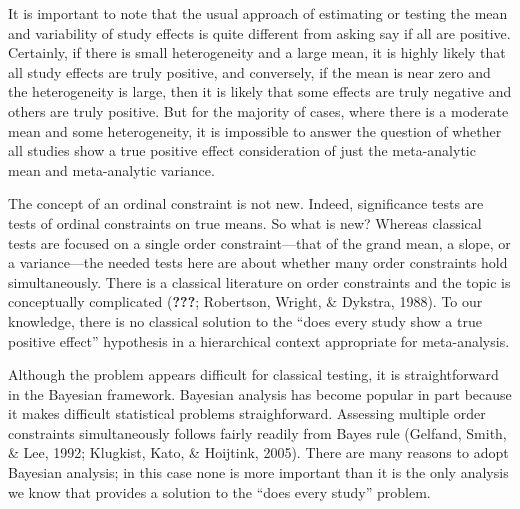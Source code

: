 \documentclass[english,man]{apa6}
\theoremstyle{definition}
\theoremstyle{definition}
\theoremstyle{definition}
\theoremstyle{remark}
\begin{document}
It is important to note that the usual approach of estimating or testing
the mean and variability of study effects is quite different from asking
say if all are positive. Certainly, if there is small heterogeneity and
a large mean, it is highly likely that all study effects are truly
positive, and conversely, if the mean is near zero and the heterogeneity
is large, then it is likely that some effects are truly negative and
others are truly positive. But for the majority of cases, where there is
a moderate mean and some heterogeneity, it is impossible to answer the
question of whether all studies show a true positive effect
consideration of just the meta-analytic mean and meta-analytic variance.

The concept of an ordinal constraint is not new. Indeed, significance
tests are tests of ordinal constraints on true means. So what is new?
Whereas classical tests are focused on a single order constraint---that
of the grand mean, a slope, or a variance---the needed tests here are
about whether many order constraints hold simultaneously. There is a
classical literature on order constraints and the topic is conceptually
complicated ({\textbf{???}}; Robertson, Wright, \& Dykstra, 1988). To
our knowledge, there is no classical solution to the \enquote{does every
study show a true positive effect} hypothesis in a hierarchical context
appropriate for meta-analysis.

Although the problem appears difficult for classical testing, it is
straightforward in the Bayesian framework. Bayesian analysis has become
popular in part because it makes difficult statistical problems
straighforward. Assessing multiple order constraints simultaneously
follows fairly readily from Bayes rule (Gelfand, Smith, \& Lee, 1992;
Klugkist, Kato, \& Hoijtink, 2005). There are many reasons to adopt
Bayesian analysis; in this case none is more important than it is the
only analysis we know that provides a solution to the \enquote{does
every study} problem.
\end{document}
